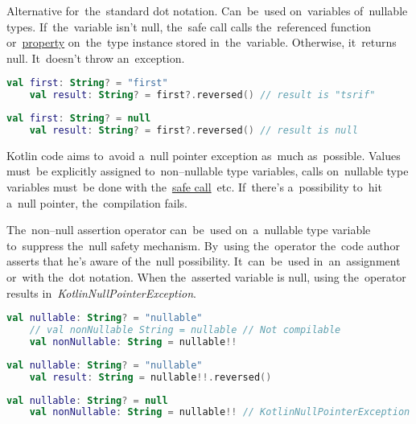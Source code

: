 \label{kotlinsafecall}
Alternative for~the~standard dot notation.
Can~be~used on~variables of~nullable types.
If~the~variable isn't null, the~safe call calls the~referenced function or~\hyperref[variablefieldproperty]{property} on~the~type instance stored in~the~variable.
Otherwise, it~returns null.
It~doesn't throw an~exception.

\begin{lstlisting}[language=Kotlin]
    val first: String? = "first"
    val result: String? = first?.reversed() // result is "tsrif"
\end{lstlisting}

\begin{lstlisting}[language=Kotlin]
    val first: String? = null
    val result: String? = first?.reversed() // result is null
\end{lstlisting}
\newpage

Kotlin code aims to~avoid a~null pointer exception as~much as~possible.
Values must~be explicitly assigned to~non--nullable type variables, calls on~nullable type variables must~be done with the~\hyperref[kotlinsafecall]{safe call}~etc.
If~there's a~possibility to~hit a~null pointer, the~compilation fails.

\mbox{The~non--null} assertion operator can~be~used on~a~nullable type variable to~suppress the~null safety mechanism.
By~using the~operator the~code author asserts that he's aware of the~null possibility.
It~can~be~used in~an~assignment or~with the~dot notation.
When the~asserted variable is null, using the~operator results \mbox{in \textit{KotlinNullPointerException}.}

\begin{lstlisting}[language=Kotlin]
    val nullable: String? = "nullable"
    // val nonNullable String = nullable // Not compilable
    val nonNullable: String = nullable!!
\end{lstlisting}

\begin{lstlisting}[language=Kotlin]
    val nullable: String? = "nullable"
    val result: String = nullable!!.reversed()
\end{lstlisting}

\begin{lstlisting}[language=Kotlin]
    val nullable: String? = null
    val nonNullable: String = nullable!! // KotlinNullPointerException
\end{lstlisting}

